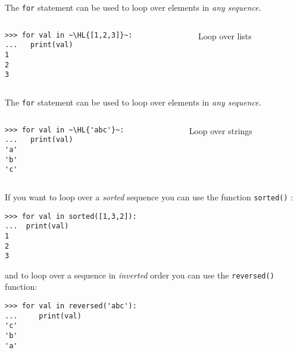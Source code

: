 \documentclass[english,serif,mathserif,xcolor=pdftex,dvipsnames,table]{beamer}
\begin{document}
\begin{frame}[fragile]
  The \texttt{for} statement can be used to loop over elements in \emph{any sequence}.

  \+
  \begin{columns}[c]
    \begin{column}{0.5\textwidth}
\begin{lstlisting}
>>> for val in ~\HL{[1,2,3]}~:
...   print(val)
1
2
3
\end{lstlisting}
    \end{column}
    \begin{column}{0.4\textwidth}
      \raggedleft
      Loop over lists
    \end{column}
  \end{columns}
\end{frame}


\begin{frame}[fragile]
  The \texttt{for} statement can be used to loop over elements in \emph{any sequence}.

  \+
  \begin{columns}[c]
    \begin{column}{0.5\textwidth}
\begin{lstlisting}
>>> for val in ~\HL{'abc'}~:
...   print(val)
'a'
'b'
'c'
\end{lstlisting}
    \end{column}
    \begin{column}{0.4\textwidth}
      \raggedleft
      Loop over strings
    \end{column}
  \end{columns}
\end{frame}

\begin{frame}[fragile]

  If you want to loop over a \textit{sorted} sequence you can use the
  function \texttt{sorted()} :

  \begin{lstlisting}
>>> for val in sorted([1,3,2]):
...  print(val)
1
2
3
  \end{lstlisting}

and to loop over a sequence in \textit{inverted} order you can use the
\texttt{reversed()} function:

\begin{lstlisting}
>>> for val in reversed('abc'):
...     print(val)
'c'
'b'
'a'
\end{lstlisting}

\end{frame}
\end{document}
